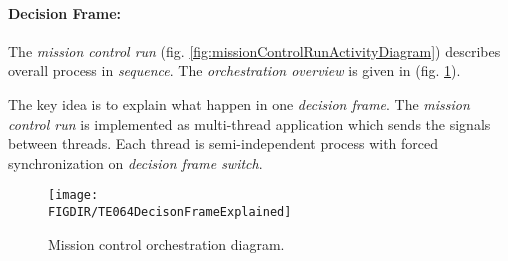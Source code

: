 \setcounter{chapter}{8}
\setcounter{section}{3}
\setcounter{subsection}{0}
\paragraph{Decision Frame:} The \emph{mission control run} (fig. \ref{fig:missionControlRunActivityDiagram}) describes overall process in \emph{sequence}. The \emph{orchestration overview} is given in (fig. \ref{fig:misisonControlRunOrchestrationDiagram}).

The key idea is to explain what happen in one \emph{decision frame}. The \emph{mission control run} is implemented as multi-thread application which sends the signals between threads. Each thread is semi-independent process with forced synchronization on \emph{decision frame switch}.

\begin{figure}[H]
    \centering
    \texttt{[image: \\FIGDIR/TE064DecisonFrameExplained]}
    \caption{Mission control orchestration diagram.}
    \label{fig:misisonControlRunOrchestrationDiagram}
\end{figure}

